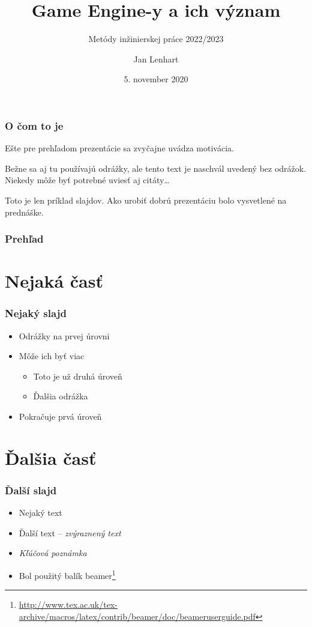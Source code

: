 \documentclass{beamer}
\author{Jan Lenhart}
\institute{
Fakulta informatiky a informačných technológií\\
Slovenská technická univerzita v Bratislave}
\subtitle{\vspace{3mm} Metódy inžinierskej práce 2022/2023}
\title{Game Engine-y a ich význam
}
\date{\footnotesize 5. november 2020}
\newcommand{\footcite}[1]{\footnote{\tiny #1}}
\newcommand{\emp}[1]{\textit{\alert{#1}}}
\newcommand{\ssection}[1]{
	\section{#1}
	\begin{frame}[fragile=singleslide]\frametitle{}
		\Huge #1
	\end{frame}
}
\begin{document}
\begin{frame}[fragile=singleslide]
	\titlepage
\end{frame}


\begin{frame}[fragile=singleslide]\frametitle{O čom to je}
	Ešte pre prehľadom prezentácie sa zvyčajne uvádza motivácia.
	
	Bežne sa aj tu používajú odrážky, ale tento text je naschvál uvedený bez odrážok. Niekedy môže byť potrebné uviesť aj citáty\ldots{}
	
	Toto je len príklad slajdov. Ako urobiť dobrú prezentáciu bolo vysvetlené na prednáške.
\end{frame}


\begin{frame}[fragile=singleslide]\frametitle{Prehľad}
	\tableofcontents
\end{frame}


\section{Nejaká časť}

\begin{frame}[fragile=singleslide]\frametitle{Nejaký slajd}
	\begin{itemize}
		\item Odrážky na prvej úrovni
		\item Môže ich byť viac
		\begin{itemize}
			\item Toto je už druhá úroveň
			\item Ďalšia odrážka
		\end{itemize}
		\item Pokračuje prvá úroveň
	\end{itemize}
\end{frame}



\section{Ďalšia časť}

\begin{frame}[fragile=singleslide]\frametitle{Ďalší slajd}
	\begin{itemize}
		\item Nejaký text
		\item Ďalší text -- \emph{zvýraznený text}
		\item \emp{Kľúčová poznámka} %
		
		\item Bol použitý balík beamer\footcite{\url{http://www.tex.ac.uk/tex-archive/macros/latex/contrib/beamer/doc/beameruserguide.pdf}}
	\end{itemize}
\end{frame}
\end{document}
